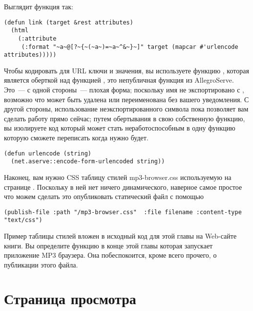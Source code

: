 Выглядит функция так:

\begin{lstlisting}
(defun link (target &rest attributes)
  (html 
    (:attribute
     (:format "~a~@[?~{~(~a~)=~a~^&~}~]" target (mapcar #'urlencode attributes)))))
\end{lstlisting}

Чтобы кодировать для URL ключи и значения, вы используете функцию ,
которая является оберткой над функцией , это непубличная
функция из AllegroServe. Это~--- с одной стороны~--- плохая форма; поскольку имя
 не экспортировано с , возможно что
 может быть удалена или переименована без вашего уведомления.
С другой стороны, использование неэкспортированного символа пока позволяет вам
сделать работу прямо сейчас; путем обертывания  в свою
собственную функцию, вы изолируете код который может стать неработоспособным в одну
функцию которую сможете переписать когда нужно будет.

\begin{lstlisting}
(defun urlencode (string)
  (net.aserve::encode-form-urlencoded string))
\end{lstlisting}

Наконец, вам нужно CSS таблицу стилей mp3-browser.css используемую на странице
. Поскольку в ней нет ничего динамического, наверное самое простое
что можем сделать это опубликовать статический файл с помощью 

\begin{lstlisting}
(publish-file :path "/mp3-browser.css"  :file filename :content-type "text/css")
\end{lstlisting}

Пример таблицы стилей вложен в исходный код для этой главы на Web-сайте книги. Вы
определите функцию в конце этой главы которая запускает приложение MP3 браузера. Она
побеспокоится, кроме всего прочего, о публикации этого файла.

\section{Страница просмотра}

